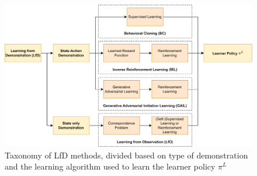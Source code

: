 \begin{figure}[tb]
    
    \includegraphics[width=\textwidth]{figures/images/il_taxonomy.png}
    \caption{Taxonomy of LfD methods, divided based on type of demonstration and the learning algorithm used to learn the learner policy $\pi^{L}$ }
    \label{fig:il_taxonomy}
    
\end{figure}
